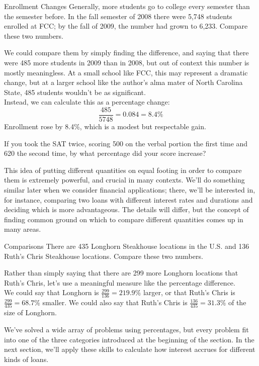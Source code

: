 \begin{example}[https://www.youtube.com/watch?v=yQmIyPZefK0&list=PLfmpjsIzhztsZtnb7HnXrQ8SLoiOCIcAM&index=11]{Enrollment Changes}
Generally, more students go to college every semester than the semester before.  In the fall semester of 2008 there were 5,748 students enrolled at FCC; by the fall of 2009, the number had grown to 6,233.  Compare these two numbers.

\sol
We could compare them by simply finding the difference, and saying that there were 485 more students in 2009 than in 2008, but out of context this number is mostly meaningless.  At a small school like FCC, this may represent a dramatic change, but at a larger school like the author's alma mater of North Carolina State, 485 students wouldn't be as significant.\\

Instead, we can calculate this as a percentage change:
\[\dfrac{485}{5748} = 0.084 = 8.4\%\]
Enrollment rose by 8.4\%, which is a modest but respectable gain.
\end{example}

\begin{try}
If you took the SAT twice, scoring 500 on the verbal portion the first time and 620 the second time, by what percentage did your score increase?
\end{try}
\pagebreak

This idea of putting different quantities on equal footing in order to compare them is extremely powerful, and crucial in many contexts.  We'll do something similar later when we consider financial applications; there, we'll be interested in, for instance, comparing two loans with different interest rates and durations and deciding which is more advantageous.  The details will differ, but the concept of finding common ground on which to compare different quantities comes up in many areas.

\begin{example}[https://www.youtube.com/watch?v=gSA_go511q4&list=PLfmpjsIzhztsZtnb7HnXrQ8SLoiOCIcAM&index=12]{Comparisons}
There are 435 Longhorn Steakhouse locations in the U.S. and 136 Ruth's Chris Steakhouse locations.  Compare these two numbers.

\sol
Rather than simply saying that there are 299 more Longhorn locations that Ruth's Chris, let's use a meaningful measure like the percentage difference.\\

We could say that Longhorn is $\frac{299}{136} = 219.9\%$ larger, or that Ruth's Chris is $\frac{299}{435} = 68.7\%$ smaller.  We could also say that Ruth's Chris is $\frac{136}{435} = 31.3\%$ of the size of Longhorn.
\end{example}

We've solved a wide array of problems using percentages, but every problem fit into one of the three categories introduced at the beginning of the section.  In the next section, we'll apply these skills to calculate how interest accrues for different kinds of loans.